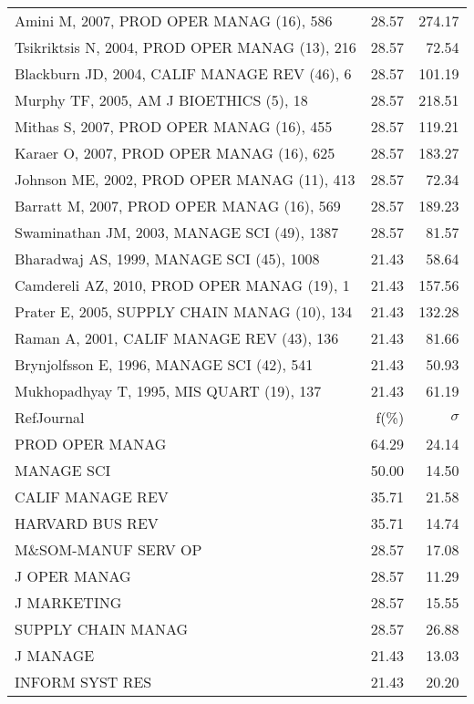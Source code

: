 \documentclass[a4paper,11pt]{report}
\begin{document}
\begin{landscape}
\begin{table}[!ht]
{\begin{tabular}{|l r r|}
Amini M, 2007, PROD OPER MANAG (16), 586 & 28.57 & 274.17\\
Tsikriktsis N, 2004, PROD OPER MANAG (13), 216 & 28.57 & 72.54\\
Blackburn JD, 2004, CALIF MANAGE REV (46), 6 & 28.57 & 101.19\\
Murphy TF, 2005, AM J BIOETHICS (5), 18 & 28.57 & 218.51\\
Mithas S, 2007, PROD OPER MANAG (16), 455 & 28.57 & 119.21\\
Karaer O, 2007, PROD OPER MANAG (16), 625 & 28.57 & 183.27\\
Johnson ME, 2002, PROD OPER MANAG (11), 413 & 28.57 & 72.34\\
Barratt M, 2007, PROD OPER MANAG (16), 569 & 28.57 & 189.23\\
Swaminathan JM, 2003, MANAGE SCI (49), 1387 & 28.57 & 81.57\\
Bharadwaj AS, 1999, MANAGE SCI (45), 1008 & 21.43 & 58.64\\
Camdereli AZ, 2010, PROD OPER MANAG (19), 1 & 21.43 & 157.56\\
Prater E, 2005, SUPPLY CHAIN MANAG (10), 134 & 21.43 & 132.28\\
Raman A, 2001, CALIF MANAGE REV (43), 136 & 21.43 & 81.66\\
Brynjolfsson E, 1996, MANAGE SCI (42), 541 & 21.43 & 50.93\\
Mukhopadhyay T, 1995, MIS QUART (19), 137 & 21.43 & 61.19\\
\hline
\hline
RefJournal & f(\%) & $\sigma$\\
\hline
PROD OPER MANAG & 64.29 & 24.14\\
MANAGE SCI & 50.00 & 14.50\\
CALIF MANAGE REV & 35.71 & 21.58\\
HARVARD BUS REV & 35.71 & 14.74\\
M\&SOM-MANUF SERV OP & 28.57 & 17.08\\
J OPER MANAG & 28.57 & 11.29\\
J MARKETING & 28.57 & 15.55\\
SUPPLY CHAIN MANAG & 28.57 & 26.88\\
J MANAGE & 21.43 & 13.03\\
INFORM SYST RES & 21.43 & 20.20\\
\hline
\end{tabular}
}
\end{table}

\clearpage


\end{landscape}
\end{document}
